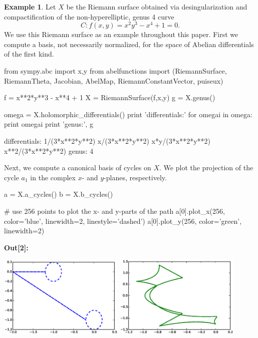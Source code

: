 \documentclass[12pt]{article}
\theoremstyle{definition}
\newtheorem{example}[theorem]{Example}
\begin{document}
\begin{example} \label{ex:riemannsurface} %
Let $X$ be the Riemann surface obtained via desingularization and
compactification of the non-hyperelliptic, genus 4 curve
\begin{equation}
  C: f(x,y) = x^2y^3 - x^4 + 1 = 0.
\end{equation}
We use this Riemann surface as an example throughout this paper. First
we compute a basis, not necessarily normalized, for the space of Abelian
differentials of the first kind.
\begin{ipythoninput}
from sympy.abc import x,y
from abelfunctions import (RiemannSurface, RiemannTheta, Jacobian,
                           AbelMap, RiemannConstantVector, puiseux)

f = x**2*y**3 - x**4 + 1
X = RiemannSurface(f,x,y)
g = X.genus()

omega = X.holomorphic_differentials()
print 'differentials:'
for omegai in omega:
    print omegai
print 'genus:', g
\end{ipythoninput}
\begin{ipythonoutput}
differentials:
1/(3*x**2*y**2)
x/(3*x**2*y**2)
x*y/(3*x**2*y**2)
x**2/(3*x**2*y**2)
genus: 4
\end{ipythonoutput}
Next, we compute a canonical basis of cycles on $X$. We plot the
projection of the cycle $a_1$ in the complex $x$- and $y$-planes,
respectively.
\begin{ipythoninput}
a = X.a_cycles()
b = X.b_cycles()

# use 256 points to plot the x- and y-parts of the path
a[0].plot_x(256, color='blue', linewidth=2, linestyle='dashed')
a[0].plot_y(256, color='green', linewidth=2)
\end{ipythoninput}
\vspace{-12pt}
\begin{ipythonoutput}
\end{ipythonoutput}
\hspace{2pt} {\footnotesize\bf\ttfamily Out[2]:}

\includegraphics[width=0.45\textwidth]{a1x.eps}
\includegraphics[width=0.45\textwidth]{a1y.eps}


\end{example}
\end{document}
